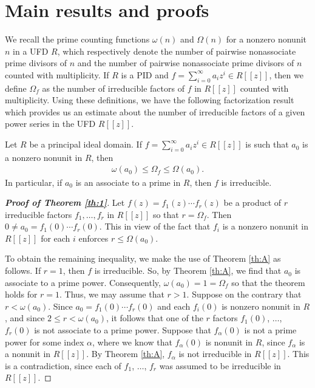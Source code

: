 \documentclass[12pt,reqno]{amsart}%
\begin{document}
\section{Main results and proofs}\label{sec:2}
We recall the prime counting functions $\omega(n)$ and $\Omega(n)$ for a nonzero nonunit $n$ in a UFD $R$, which respectively denote the number of pairwise nonassociate prime divisors of $n$ and the number of pairwise nonassociate prime divisors of $n$ counted with multiplicity. If $R$ is a PID and $f=\sum_{i=0}^\infty a_i z^i \in R[[z]]$, then we define $\Omega_f$ as the number of irreducible factors of $f$ in $R[[z]]$ counted with multiplicity. Using these definitions, we have the following factorization result which provides us an estimate about the number of irreducible factors of a given power series in the UFD $R[[z]]$.
\begin{theorem}\label{th:1}
Let $R$ be a principal ideal domain. If $f=\sum_{i=0}^\infty a_i z^i \in R[[z]]$ is such that $a_0$ is a nonzero nonunit in $R$, then
\begin{eqnarray*}
\omega(a_0)\leq \Omega_f\leq \Omega(a_0).
\end{eqnarray*}
In particular, if $a_0$ is an associate to a prime in $R$, then $f$ is irreducible.
\end{theorem}
\begin{proof}[\bf Proof of Theorem \ref{th:1}]
Let $f(z)=f_1(z)\cdots f_r(z)$ be a product of $r$ irreducible factors $f_1,\ldots,f_r$ in $R[[z]]$ so that $r=\Omega_f$. Then $0\neq a_0=f_1(0)\cdots f_r(0)$. This in view of the fact that $f_i$ is a nonzero nonunit in $R[[z]]$ for each $i$ enforces $r\leq \Omega(a_0)$.

To obtain the remaining inequality, we make the use of Theorem \ref{th:A} as follows.  If $r=1$, then $f$ is irreducible. So, by Theorem \ref{th:A}, we find that $a_0$ is associate to a prime power. Consequently, $\omega(a_0)=1=\Omega_f$ so that the theorem holds for $r=1$. Thus, we may assume that $r>1$. Suppose on the contrary that $r<\omega(a_0)$. Since $a_0=f_1(0)\cdots f_r(0)$ and each $f_i(0)$ is nonzero nonunit in $R$, and since $2\leq r<\omega(a_0)$, it follows that one of the $r$ factors $f_1(0)$, $\ldots$, $f_r(0)$ is not associate to a prime power. Suppose that $f_\alpha(0)$ is not a prime power for some index $\alpha$, where we know that $f_\alpha(0)$ is nonunit in $R$, since $f_\alpha$ is a nonunit in $R[[z]]$. By Theorem \ref{th:A}, $f_\alpha$ is not irreducible in $R[[z]]$. This is a contradiction, since each of $f_1$, $\ldots$, $f_r$ was assumed to be irreducible in $R[[z]]$.
\end{proof}
\end{document}
